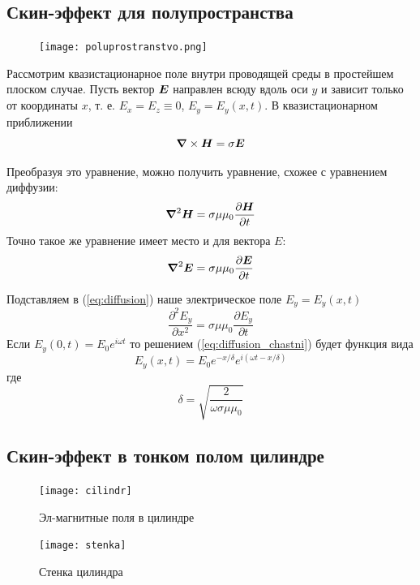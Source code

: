 \documentclass[a4paper,12pt]{article}
\begin{document}
\subsection{Скин-эффект для полупространства}

\begin{figure}
    \begin{center}
        \texttt{[image: poluprostranstvo.png]}
    \end{center}
\end{figure}

Рассмотрим квазистационарное поле внутри проводящей среды в простейшем плоском случае.
Пусть вектор $\vb*{E}$ направлен всюду вдоль оси $y$ и зависит только от координаты $x$, т. е. ${E_x} = {E_z} \equiv 0$, $E_y=E_y(x,t)$.
В квазистационарном приближении 
\begin{equation}
    \grad \times \vb*{H} = \sigma \vb*{E}
\end{equation}

Преобразуя это уравнение, можно получить уравнение, схожее с уравнением диффузии:
\begin{equation}
    \grad^2\vb*{H}=\sigma\mu\mu_0 \frac{\partial \vb*{H}}{\partial t}\label{eq:laplacian_H}
\end{equation}
Точно такое же уравнение имеет место и для вектора $E:$
\begin{equation}
    \grad^2\vb*{E}=\sigma\mu\mu_0 \frac{\partial \vb*{E}}{\partial t}\label{eq:diffusion}
\end{equation}

Подставляем в (\ref{eq:diffusion}) наше электрическое поле $E_y=E_y(x,t)$
\begin{equation}
    \frac{\partial^2 E_y}{\partial x^2} = \sigma\mu\mu_0\frac{\partial E_y}{\partial t}
    \label{eq:diffusion_chastni}
\end{equation}
Если $E_y(0,t)=E_0 e^{i\omega t}$ то решением (\ref{eq:diffusion_chastni}) будет функция вида
\begin{equation}
    E_y(x,t)=E_0 e^{-x/\delta} e^{i(\omega t - x/\delta)}
    \label{eq:skin_effect_poluprostranstvo}
\end{equation}
где
\begin{equation}
    \delta = \sqrt{\frac{2}{\omega\sigma\mu\mu_0}}
    \label{eq:delta}
\end{equation}
\subsection{Скин-эффект в тонком полом цилиндре}
\vspace{1cm}
\begin{figure}
    \begin{center}
        \texttt{[image: cilindr]}
    \end{center}
    \caption{Эл-магнитные поля в цилиндре}\label{fig:cilindr}
    
    \begin{center}
        \texttt{[image: stenka]}
    \end{center}
    \caption{Стенка цилиндра}\label{fig:stenka}
\end{figure}
\end{document}
